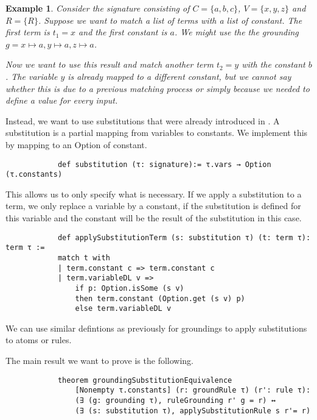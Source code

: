 \documentclass{article}
\newtheorem{example}{Example}
\begin{document}
            \begin{example}
                Consider the signature consisting of $C = \{a,b,c\}$, $V = \{x,y,z \}$ and $R = \{R\}$. Suppose we want to match a list of terms with a list of constant. The first term is $t_1 = x$ and the first constant is $a$. We might use the the grounding $g = x \mapsto a, y \mapsto a, z \mapsto a$.

                Now we want to use this result and match another term $t_2 = y$ with the constant $b$. The variable $y$ is already mapped to a different constant, but we cannot say whether this is due to a previous matching process or simply because we needed to define a value for every input.
                

                
            \end{example}

            Instead, we want to use substitutions that were already introduced in \cite{datalogCoq}. A substitution is a partial mapping from variables to constants. We implement this by mapping to an Option of constant.

            \begin{lstlisting}
            def substitution (τ: signature):= τ.vars → Option (τ.constants)
            \end{lstlisting}

            This allows us to only specify what is necessary. If we apply a substitution to a term, we only replace a variable by a constant, if the substitution is defined for this variable and the constant will be the result of the substitution in this case.

            \begin{lstlisting}
            def applySubstitutionTerm (s: substitution τ) (t: term τ): term τ :=
            match t with
            | term.constant c => term.constant c
            | term.variableDL v => 
                if p: Option.isSome (s v) 
                then term.constant (Option.get (s v) p) 
                else term.variableDL v
            \end{lstlisting}

            We can use similar defintions as previously for groundings to apply substitutions to atoms or rules.

            The main result we want to prove is the following.

            \begin{lstlisting}
            theorem groundingSubstitutionEquivalence 
                [Nonempty τ.constants] (r: groundRule τ) (r': rule τ):
                (∃ (g: grounding τ), ruleGrounding r' g = r) ↔ 
                (∃ (s: substitution τ), applySubstitutionRule s r'= r)
            \end{lstlisting}
\end{document}

